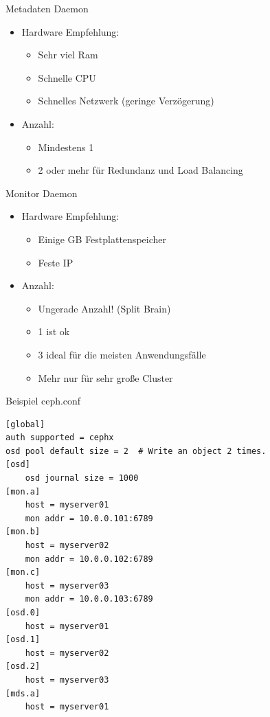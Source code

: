 \documentclass[hyperref={xetex}]{beamer}
\begin{document}
\begin{frame}{Metadaten Daemon}
	\begin{itemize}

		\item Hardware Empfehlung:
		\begin{itemize}
			\item Sehr viel Ram
			\item Schnelle CPU
			\item Schnelles Netzwerk (geringe Verz\"ogerung)
		\end{itemize}
		\item Anzahl: 
		\begin{itemize}
			\item Mindestens 1
			\item 2 oder mehr f\"ur Redundanz und Load Balancing
		\end{itemize}
	\end{itemize}
\end{frame}


\begin{frame}{Monitor Daemon}
	\begin{itemize}
		\item Hardware Empfehlung:
		\begin{itemize}
			\item Einige GB Festplattenspeicher
			\item Feste IP
		\end{itemize}
		\item Anzahl:
		\begin{itemize}
			\item Ungerade Anzahl! (Split Brain)
			\item 1 ist ok
			\item 3 ideal f\"ur die meisten Anwendungsf\"alle
			\item Mehr nur f\"ur sehr große Cluster
		\end{itemize}
	\end{itemize}
\end{frame}

\begin{frame}[fragile]{Beispiel ceph.conf}

\begin{lstlisting}
[global]
auth supported = cephx
osd pool default size = 2  # Write an object 2 times.
[osd]
	osd journal size = 1000
[mon.a]
	host = myserver01
	mon addr = 10.0.0.101:6789
[mon.b]
	host = myserver02
	mon addr = 10.0.0.102:6789
[mon.c]
	host = myserver03
	mon addr = 10.0.0.103:6789
[osd.0]
	host = myserver01
[osd.1]
	host = myserver02
[osd.2]
	host = myserver03
[mds.a]
	host = myserver01
\end{lstlisting}
\end{frame}
\end{document}
